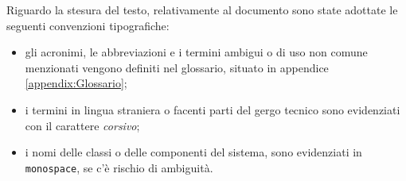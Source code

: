 Riguardo la stesura del testo, relativamente al documento sono state adottate le seguenti convenzioni tipografiche:
\begin{itemize}
	\item gli acronimi, le abbreviazioni e i termini ambigui o di uso non comune menzionati vengono definiti nel glossario, situato in appendice \ref{appendix:Glossario};
	\item i termini in lingua straniera o facenti parti del gergo tecnico sono evidenziati con il carattere \emph{corsivo};
	\item i nomi delle classi o delle componenti del sistema, sono evidenziati in \texttt{monospace}, se c'è rischio di ambiguità.
\end{itemize}
